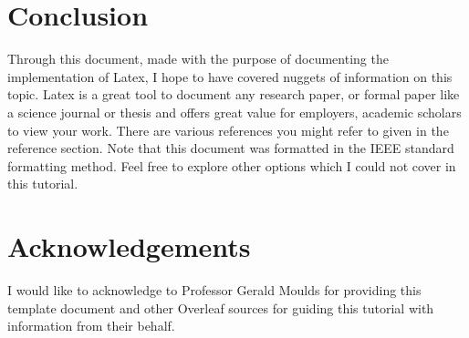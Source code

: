 \documentclass[12pt,journal,compsoc]{IEEEtran}
\begin{document}
\section{Conclusion}
Through this document, made with the purpose of documenting the implementation of Latex, I hope to have covered nuggets of information on this topic. Latex is a great tool to document any research paper, or formal paper like a science journal or thesis and offers great value for employers, academic scholars to view your work. There are various references you might refer to given in the reference section. Note that this document was formatted in the IEEE standard formatting method. Feel free to explore other options which I could not cover in this tutorial. 

\section*{Acknowledgements}
I would like to acknowledge to Professor Gerald Moulds for providing this template document and other Overleaf sources for guiding this tutorial with information from their behalf.











\end{document}

